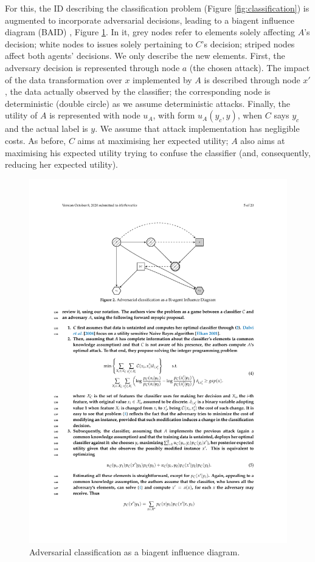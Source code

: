 For this, the ID describing the classification problem (Figure \ref{fig:classification}) is augmented to incorporate adversarial decisions, leading to a biagent influence diagram (BAID) \parencite{Banks},
 Figure \ref{fig:jointProblem}. { In it, grey nodes refer to elements solely affecting $A$'s decision; white nodes to issues solely pertaining to $C$'s decision; striped nodes affect both agents' 
decisions}. %
We only describe the new elements. 
First, the adversary decision is represented through node $a$ (the chosen attack). The impact of the data transformation over $x$ implemented by $A$ is described through node $x'$, the data actually observed by the classifier; the 
corresponding node is deterministic 
(double circle) as we assume deterministic attacks.
Finally, the utility of $A$ is represented with node $u_A$,
with form  $u_A(y_c, y)$, when $C$ says $y_c$ and the actual label is $y$.
 We assume that attack implementation has negligible
costs.
As before, $C$ aims at maximising her 
expected utility; $A$ also aims at maximising his expected utility 
trying to confuse the classifier (and, consequently, reducing her 
expected utility). %
\begin{figure}[H]
\centering
\includegraphics[scale=1]{figures/2.pdf}
\caption{Adversarial classification as a biagent influence diagram.}\label{fig:jointProblem}
\end{figure}

